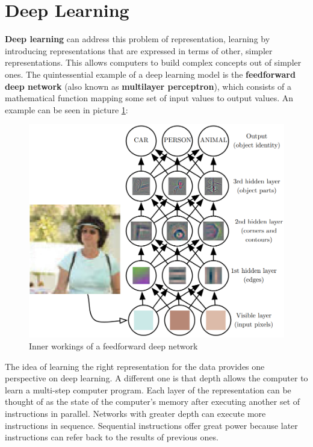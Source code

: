 \section{Deep Learning}
\textbf{Deep learning} can address this problem of representation, learning by introducing representations that are expressed in terms of other, simpler representations. This allows computers to build complex concepts out of simpler ones. The quintessential example of a deep learning model is the \textbf{feedforward deep network} (also known as \textbf{multilayer perceptron}), which consists of a mathematical function mapping some set of input values to output values. An example can be seen in picture \ref{fig:ch6-innerworkingsofaffdn}:

\begin{figure}[hbt]
    \centering
    \includegraphics[scale=0.35]{Images/Chapter 6/ffdn-layers.png}
    \caption{Inner workings of a feedforward deep network}
    \label{fig:ch6-innerworkingsofaffdn}
\end{figure}

The idea of learning the right representation for the data provides one perspective on deep learning. A different one is that depth allows the computer to learn a multi-step computer program. Each layer of the representation can be thought of as the state of the computer’s memory after executing another set of instructions in parallel. Networks with greater depth can execute more instructions in sequence. Sequential instructions offer great power because later instructions can refer back to the results of previous ones.

